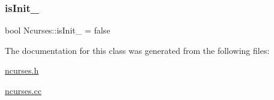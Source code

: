 \subsubsection{\texorpdfstring{is\+Init\+\_\+}{isInit\_}}
{\footnotesize\ttfamily bool Ncurses\+::is\+Init\+\_\+ = false\hspace{0.3cm}{\ttfamily [private]}}



The documentation for this class was generated from the following files\+:\begin{DoxyCompactItemize}
\item 
\mbox{\hyperlink{ncurses_8h}{ncurses.\+h}}\item 
\mbox{\hyperlink{ncurses_8cc}{ncurses.\+cc}}\end{DoxyCompactItemize}

